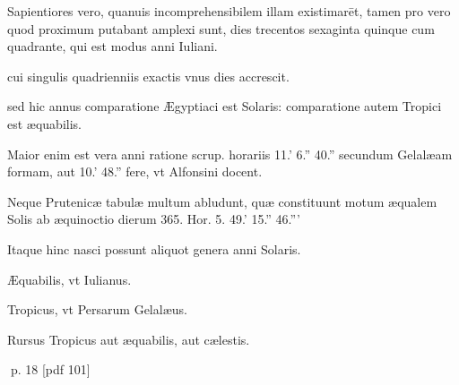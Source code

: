 \begin{parnumbers}
Sapientiores vero, quanuis incomprehensibilem illam existimarēt, tamen pro vero quod proximum putabant amplexi sunt, dies trecentos sexaginta quinque cum quadrante, qui est modus anni Iuliani.

cui singulis quadrienniis exactis vnus dies accrescit.

sed hic annus comparatione Ægyptiaci  est Solaris: comparatione autem Tropici est æquabilis.

Maior enim est vera anni ratione scrup. horariis 11.' 6.'' 40.'' secundum Gelalæam formam, aut 10.' 48.'' fere, vt Alfonsini docent.

Neque Prutenicæ tabulæ multum abludunt, quæ constituunt motum æqualem Solis ab æquinoctio dierum 365. Hor. 5. 49.' 15.'' 46.'''

Itaque hinc nasci possunt aliquot genera anni Solaris.

Æquabilis, vt Iulianus.

Tropicus, vt Persarum Gelalæus.

Rursus Tropicus aut æquabilis, aut cælestis.

\end{parnumbers}
\clearpage
p. 18 [pdf 101]

